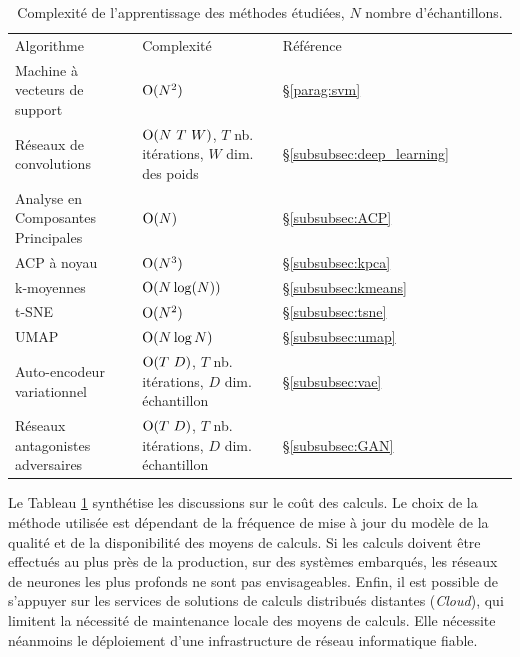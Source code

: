\begin{table}[h]
    \centering
    \begin{tabular}{|l|l|l|l|l|l|l|}
        \arrayrulecolor{black}
        \hhline{---}
        Algorithme  & Complexité & Référence\\
        \hhline{=:=:=:} %
        Machine à vecteurs de support      & $\operatorname{O}(N^2)$        & §\ref{parag:svm} \\ \hline
        Réseaux de convolutions & $\bigO(N \ T \ W)$, $T$ nb. itérations, $W$ dim. des poids & §\ref{subsubsec:deep_learning}\\
        \hhline{=:=:=:} %
        Analyse en Composantes Principales & $\operatorname{O}(N)$          & §\ref{subsubsec:ACP}\\ \hline
        ACP à noyau                        & $\operatorname{O}(N^3)$        & §\ref{subsubsec:kpca}\\ \hline
        \hhline{=:=:=:}
        k-moyennes                         & $\operatorname{O}(N \log(N))$  & §\ref{subsubsec:kmeans} \\ \hline
        t-SNE                              & $\operatorname{O}(N^2)$        & §\ref{subsubsec:tsne}\\ \hline
        UMAP                               & $\operatorname{O}(N \log N)$   & §\ref{subsubsec:umap}\\ \hline
        Auto-encodeur variationnel        & $\bigO(T \ D)$, $T$ nb. itérations, $D$ dim. échantillon  & §\ref{subsubsec:vae}\\ \hline
        Réseaux antagonistes adversaires   & $\bigO(T \ D)$, $T$ nb. itérations, $D$ dim. échantillon & §\ref{subsubsec:GAN}\\ \hline
    \end{tabular}
    \caption{Complexité de l'apprentissage des méthodes étudiées, $N$ nombre d'échantillons.}
    \label{tab:overview}
\end{table}

Le Tableau \ref{tab:overview} synthétise les discussions sur le coût des calculs.
Le choix de la méthode utilisée est dépendant de la fréquence de mise à jour du modèle de la qualité et de la disponibilité des moyens de calculs.
Si les calculs doivent être effectués au plus près de la production, sur des systèmes embarqués, les réseaux de neurones les plus profonds ne sont pas envisageables.
Enfin, il est possible de s'appuyer sur les services de solutions de calculs distribués distantes (\textit{Cloud}), qui limitent la nécessité de maintenance locale des moyens de calculs.
Elle nécessite néanmoins le déploiement d'une infrastructure de réseau informatique fiable.

